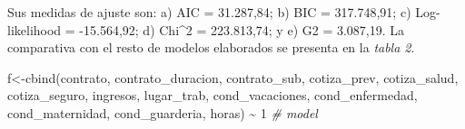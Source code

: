 \documentclass[
]{article}
\newenvironment{Shaded}{\begin{snugshade}}{\end{snugshade}}
\newcommand{\CommentTok}[1]{\textcolor[rgb]{0.56,0.35,0.01}{\textit{#1}}}
\newcommand{\DecValTok}[1]{\textcolor[rgb]{0.00,0.00,0.81}{#1}}
\newcommand{\FunctionTok}[1]{\textcolor[rgb]{0.00,0.00,0.00}{#1}}
\newcommand{\NormalTok}[1]{#1}
\newcommand{\OtherTok}[1]{\textcolor[rgb]{0.56,0.35,0.01}{#1}}
\newcommand{\SpecialCharTok}[1]{\textcolor[rgb]{0.00,0.00,0.00}{#1}}
\begin{document}
Sus medidas de ajuste son: a) AIC = 31.287,84; b) BIC = 317.748,91; c)
Log-likelihood = -15.564,92; d) Chi\^{}2 = 223.813,74; y e) G2 =
3.087,19. La comparativa con el resto de modelos elaborados se presenta
en la \emph{tabla 2}.

\begin{Shaded}
\begin{Highlighting}[]
\NormalTok{f}\OtherTok{\textless{}{-}}\FunctionTok{cbind}\NormalTok{(contrato,}
\NormalTok{         contrato\_duracion,}
\NormalTok{         contrato\_sub,}
\NormalTok{         cotiza\_prev,}
\NormalTok{         cotiza\_salud,}
\NormalTok{         cotiza\_seguro,}
\NormalTok{         ingresos,}
\NormalTok{         lugar\_trab,}
\NormalTok{         cond\_vacaciones,}
\NormalTok{         cond\_enfermedad,}
\NormalTok{         cond\_maternidad,}
\NormalTok{         cond\_guarderia,}
\NormalTok{         horas) }\SpecialCharTok{\textasciitilde{}} \DecValTok{1} \CommentTok{\# model}
\end{Highlighting}
\end{Shaded}
\end{document}
